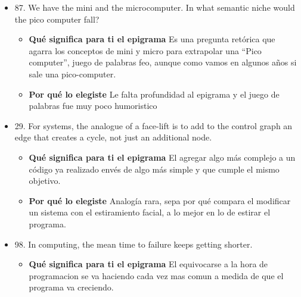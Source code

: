 \documentclass{article}
\begin{document}
\begin{itemize}
    \item 87. We have the mini and the microcomputer. In what semantic niche would the pico computer fall?
            \begin{itemize}
            \item \textbf{ Qué significa para ti el epigrama} 
                \newline Es una pregunta retórica que agarra los conceptos de mini y micro para extrapolar una “Pico computer”, juego de palabras feo, aunque como vamos en algunos años si sale una pico-computer.
            
                
            \item \textbf{ Por qué lo elegiste}
            \newline Le falta profundidad al epigrama y el juego de palabras fue muy poco humoristico 
        \end{itemize}
        
    \item 29. For systems, the analogue of a face-lift is to add to the control graph an edge that creates a cycle, not just an additional node.
            \begin{itemize}
            \item \textbf{ Qué significa para ti el epigrama} 
                \newline El agregar algo más complejo a un código ya realizado envés de algo más simple y que cumple el mismo objetivo.
                
            \item \textbf{ Por qué lo elegiste}
            \newline Analogía rara, sepa por qué compara el modificar un sistema con el estiramiento facial, a lo mejor en lo de estirar el programa.
        \end{itemize}
    \item 98. In computing, the mean time to failure keeps getting shorter.
            \begin{itemize}
            \item \textbf{ Qué significa para ti el epigrama} 
                \newline El equivocarse a la hora de programacion se va haciendo cada vez mas comun a medida de que el programa va creciendo. 
            

\end{itemize}
\end{itemize}
\end{document}
